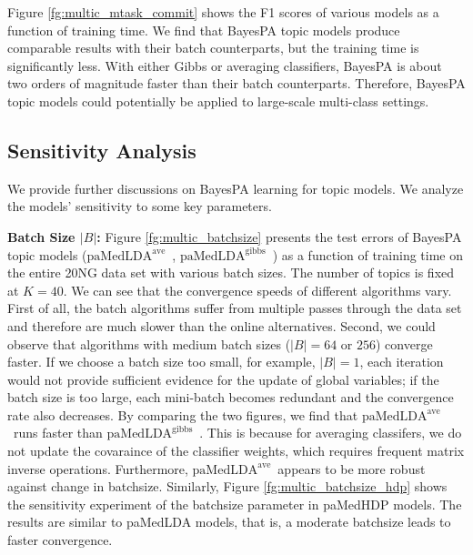 \documentclass[twoside,11pt]{article}
\newcommand\paMedLDAave{$\text{paMedLDA}^{\text{ave}}$~}
\newcommand\paMedLDAgibbs{$\text{paMedLDA}^{\text{gibbs}}$~}
\newcommand{\junx}[1]{{\color{red}{\bf\sf #1}}}
\begin{document}
Figure \ref{fg:multic_mtask_commit} shows the F1 scores of various models as a function of training time. We find that BayesPA topic models produce comparable results with their batch counterparts, but the training time is significantly less. With either Gibbs or averaging classifiers, BayesPA is about two orders of magnitude faster than their batch counterparts. Therefore, BayesPA topic models could potentially be applied to large-scale multi-class settings.






\subsection{Sensitivity Analysis}\label{sec:sensitivity}

We provide further discussions on BayesPA learning for topic models. We analyze the models' sensitivity to some  key parameters.






\textbf{Batch Size $|B|$: } Figure \ref{fg:multic_batchsize} presents the test errors of BayesPA topic models (\paMedLDAave, \paMedLDAgibbs) as a function of training time on the entire 20NG data set with various batch sizes. The number of topics is fixed at $K = 40$. We can see that the convergence speeds of different algorithms vary. First of all, the batch algorithms suffer from multiple passes through the data set and therefore are much slower than the online alternatives. Second, we could observe that algorithms with medium batch sizes ($|B| = 64$ or $256$) converge faster. If we choose a batch size too small, for example, $|B| = 1$, each iteration would not provide sufficient evidence for the update of global variables; if the batch size is too large, each mini-batch becomes redundant and the convergence rate also decreases. By comparing the two figures, we find that \paMedLDAave runs faster than \paMedLDAgibbs. This is because for averaging classifers, we do not update the covaraince of the classifier weights, which requires frequent matrix inverse operations. Furthermore, \paMedLDAave appears to be more robust against change in batchsize. Similarly, Figure \ref{fg:multic_batchsize_hdp} shows the sensitivity experiment of the batchsize parameter in paMedHDP models. The results are similar to paMedLDA models, that is, a moderate batchsize leads to faster convergence.
\end{document}
